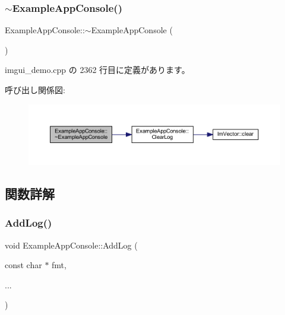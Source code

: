 \subsubsection{\texorpdfstring{$\sim$\+Example\+App\+Console()}{~ExampleAppConsole()}}
{\footnotesize\ttfamily Example\+App\+Console\+::$\sim$\+Example\+App\+Console (\begin{DoxyParamCaption}{ }\end{DoxyParamCaption})\hspace{0.3cm}{\ttfamily [inline]}}



 imgui\+\_\+demo.\+cpp の 2362 行目に定義があります。

呼び出し関係図\+:\nopagebreak
\begin{figure}[H]
\begin{center}
\leavevmode
\includegraphics[width=350pt]{struct_example_app_console_a91ef200056f867cf97a57db91bb991c4_cgraph}
\end{center}
\end{figure}


\subsection{関数詳解}
\mbox{\label{struct_example_app_console_a719354ce6be7481923a5fd702e785952}} 
\subsubsection{\texorpdfstring{Add\+Log()}{AddLog()}}
{\footnotesize\ttfamily void Example\+App\+Console\+::\+Add\+Log (\begin{DoxyParamCaption}\item[{const char $\ast$}]{fmt,  }\item[{}]{... }\end{DoxyParamCaption})\hspace{0.3cm}{\ttfamily [inline]}}



